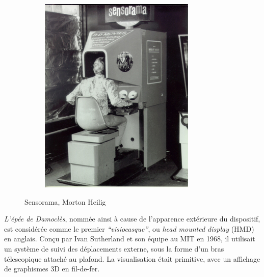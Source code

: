 \documentclass[a4,12pt]{scrartcl}
\begin{document}
\begin{figure}[H]
\begin{subfigure}{.4\textwidth}
	  \includegraphics[width=0.8\linewidth]{sensorama}
	\end{subfigure}

 	\caption{Sensorama, Morton Heilig}
\end{figure}


\emph{L’épée de Damoclès}, nommée ainsi à cause de l’apparence extérieure du dispositif, est considérée comme le premier \emph{“visiocasque”}, ou \emph{head mounted display} (HMD) en anglais. Conçu par Ivan Sutherland et son équipe au MIT en 1968, il utilisait un système de suivi des déplacements externe, sous la forme d’un bras télescopique attaché au plafond. La visualisation était primitive, avec un affichage de graphismes 3D en fil-de-fer.
\end{document}
